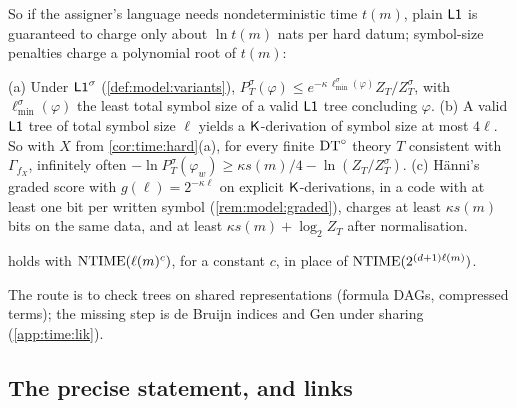 So if the assigner's language needs nondeterministic time $t(m)$, plain $\mathord{\mathsf{L1}}$ is guaranteed to charge only about $\ln t(m)$ nats per hard datum; symbol-size penalties charge a polynomial root of $t(m)$:

\begin{proposition}\label{prop:time:sigma}
(a) Under $\mathord{\mathsf{L1}}^{\sigma}$ (\cref{def:model:variants}), $P^\sigma_T(\varphi)\le e^{-\kappa\,\ell^\sigma_{\min}(\varphi)}Z_T/Z^\sigma_T$, with $\ell^\sigma_{\min}(\varphi)$ the least total symbol size of a valid $\mathord{\mathsf{L1}}$ tree concluding $\varphi$.
(b) A valid $\mathord{\mathsf{L1}}$ tree of total symbol size $\ell$ yields a $\mathsf{K}$-derivation of symbol size at most $4\ell$. So with $X$ from \cref{cor:time:hard}(a), for every finite $\mathrm{DT}^{\circ}$ theory $T$ consistent with $\Gamma_{f_X}$, infinitely often $-\ln P^\sigma_T(\varphi_w)\ge\kappa s(m)/4-\ln(Z_T/Z^\sigma_T)$.
(c) H\"anni's graded score with $g(\ell)=2^{-\kappa\ell}$ on explicit $\mathsf{K}$-derivations, in a code with at least one bit per written symbol (\cref{rem:model:graded}), charges at least $\kappa s(m)$ bits on the same data, and at least $\kappa s(m)+\log_2Z_T$ after normalisation.
\end{proposition}

\begin{conjecture}\label{conj:time:poly}
 holds with $\mathrm{NTIME}(\ell(m)^c)$, for a constant $c$, in place of $\mathrm{NTIME}(2^{(d+1)\ell(m)})$.
\end{conjecture}

The route is to check trees on shared representations (formula DAGs, compressed terms); the missing step is de Bruijn indices and Gen under sharing (\cref{app:time:lik}).

\subsection{The precise statement, and links}\label{sec:time:summary}

